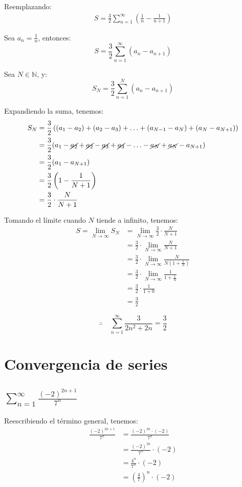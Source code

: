 \documentclass{article}
\newcommand{\N}{\mathbb{N}}
\begin{document}
Reemplazando:
\begin{align*}
S = \frac{3}{2} \sum_{n=1}^{\infty} \left( \frac{1}{n} - \frac{1}{n + 1} \right)
\end{align*}

Sea $a_n = \frac{1}{n}$, entonces:
\[
S = \frac{3}{2} \sum_{n=1}^\infty \left( a_n - a_{n + 1}\right)
\]

Sea $N \in \N$, y:
\[
S_N = \frac{3}{2} \sum_{n=1}^N \left( a_n - a_{n + 1}\right)
\]

Expandiendo la suma, tenemos:
\begin{align*}
S_N &= \frac{3}{2} \left( (a_1 - a_2) + (a_2 - a_3) + \ldots + (a_{N-1} - a_N) + (a_N - a_{N+1}) \right)\\
&= \frac{3}{2} (a_1 - \cancel{a_2} + \cancel{a_2} - \cancel{a_3} + \cancel{a_3} - \ldots - \cancel{a_N} + \cancel{a_N} - a_{N+1})\\
&= \frac{3}{2} (a_1 - a_{N+1})\\
&= \frac{3}{2} \left(1 - \frac{1}{N+1}\right)\\
&= \frac{3}{2} \cdot \frac{N}{N+1}
\end{align*}

Tomando el límite cuando $N$ tiende a infinito, tenemos:
\begin{align*}
S = \lim_{N \to \infty} S_N &= \lim_{N \to \infty} \frac{3}{2} \cdot \frac{N}{N+1}\\
&= \frac{3}{2} \cdot \lim_{N \to \infty} \frac{N}{N+1}\\
&= \frac{3}{2} \cdot \lim_{N \to \infty} \frac{N}{N \left(1 + \frac{1}{N} \right)}\\
&= \frac{3}{2} \cdot \lim_{N \to \infty} \frac{1}{1 + \frac{1}{N}}\\
&= \frac{3}{2} \cdot \frac{1}{1 + 0}\\
&= \boxed{\frac{3}{2}}
\end{align*}

\[
\therefore
\quad
\sum_{n=1}^{\infty} \frac{3}{2n^2 + 2n} = \frac{3}{2}
\]

\section{Convergencia de series}

\subsection{$\sum_{n=1}^{\infty} \frac{(-2)^{2n+1}}{7^n}$}

Reescribiendo el término general, tenemos:
\begin{align*}
\frac{(-2)^{2n+1}}{7^n} &= \frac{(-2)^{2n} \cdot (-2)}{7^n} \\
&= \frac{(-2)^{2n}}{7^n} \cdot (-2) \\
&= \frac{4^n}{7^n} \cdot (-2) \\
&= \left(\frac{4}{7}\right)^n \cdot (-2)
\end{align*}
\end{document}
